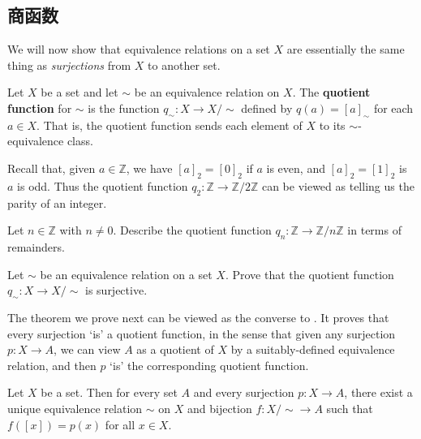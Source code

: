 \subsection*{商函数}

We will now show that equivalence relations on a set $X$ are essentially the same thing as \textit{surjections} from $X$ to another set.

\begin{definition}
\label{defQuotientFunction}
Let $X$ be a set and let $\sim$ be an equivalence relation on $X$. The \textbf{quotient function} for $\sim$ is the function $q_{\sim} : X \to X/{\sim}$ defined by $q(a) = [a]_{\sim}$ for each $a \in X$. That is, the quotient function sends each element of $X$ to its $\sim$-equivalence class.
\end{definition}

\begin{example}
Recall that, given $a \in \mathbb{Z}$, we have $[a]_2 = [0]_2$ if $a$ is even, and $[a]_2 = [1]_2$ is $a$ is odd. Thus the quotient function $q_2 : \mathbb{Z} \to \mathbb{Z}/2\mathbb{Z}$ can be viewed as telling us the parity of an integer.
\end{example}

\begin{exercise}
Let $n \in \mathbb{Z}$ with $n \ne 0$. Describe the quotient function $q_n : \mathbb{Z} \to \mathbb{Z}/n\mathbb{Z}$ in terms of remainders.
\end{exercise}

\begin{exercise}
\label{exQuotientFunctionIsSurjective}
Let $\sim$ be an equivalence relation on a set $X$. Prove that the quotient function $q_{\sim} : X \to X/{\sim}$ is surjective.
\end{exercise}

The theorem we prove next can be viewed as the converse to . It proves that every surjection `is' a quotient function, in the sense that given any surjection $p : X \to A$, we can view $A$ as a quotient of $X$ by a suitably-defined equivalence relation, and then $p$ `is' the corresponding quotient function.

\begin{theorem}
\label{thmEquivalenceRelationsSurjections}
Let $X$ be a set. Then for every set $A$ and every surjection $p : X \to A$, there exist a unique equivalence relation $\sim$ on $X$ and bijection $f : X/{\sim} \to A$ such that $f([x]) = p(x)$ for all $x \in X$.
\end{theorem}

